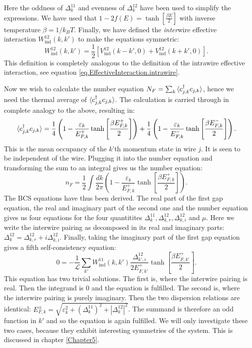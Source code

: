 Here the oddness of $\Delta^{11}_k$ and evenness of $\Delta^{12}_k$ have been used to simplify the expressions. We have used that $1 - 2f(E) = \tanh\left[\frac{\beta E}{2}\right]$ with inverse temperature $\beta = 1 / k_BT$. Finally, we have defined the \textit{inter}wire effective interaction $W_{\text{ind}}^{12}(k, k')$ to make the equations symmetric:
\begin{equation}
W_{\text{ind}}^{12}(k, k') = \frac{1}{2}\left[V_{\text{ind}}^{12}(k - k', 0) + V_{\text{ind}}^{12}(k + k', 0) \right].
\label{eq.EffectiveInteraction.interwire}
\end{equation}
This definition is completely analogous to the definition of the intrawire effective interaction, see equation \eqref{eq.EffectiveInteraction.intrawire}. 

Now we wish to calculate the number equation $N_F = \sum_k \braket{c^\dagger_{j,k}c_{j,k}}$, hence we need the thermal average of $\braket{c^\dagger_{j,k}c_{j,k}}$. The calculation is carried through in complete analogy to the above, resulting in:
\begin{equation}
\braket{c^\dagger_{j,k}c_{j,k}} = \frac{1}{4}\left( 1 - \frac{\varepsilon_k}{E^{+}_{F,k}}\tanh\left[\frac{\beta E^{+}_{F,k}}{2}\right] \right) + \frac{1}{4}\left( 1 - \frac{\varepsilon_k}{E^{-}_{F,k}}\tanh\left[\frac{\beta E^{-}_{F,k}}{2}\right] \right).
\label{eq.meanoccupancy}
\end{equation}
This is the mean occupancy of the $k$'th momentum state in wire $j$. It is seen to be independent of the wire. Plugging it into the number equation and transforming the sum to an integral gives us the number equation:
\begin{equation}
n_F = \frac{1}{2}\int \frac{dk}{2\pi} \left( 1 - \frac{\varepsilon_k}{E^{+}_{F,k}}\tanh\left[\frac{\beta E^{+}_{F,k}}{2}\right] \right). 
\label{eq.2wiresnumberequation}
\end{equation}
The BCS equations have thus been derived. The real part of the first gap equation, the real and imaginary part of the second one and the number equation gives us four equations for the four quantitites $\Delta^{11}_k, \Delta^{12}_{k,r}, \Delta^{12}_{k,i} $ and $\mu$. Here we write the interwire pairing as decomposed in its real and imaginary parts: $\Delta^{12}_k = \Delta^{12}_{k,r} + i\Delta^{12}_{k,i}$. Finally, taking the imaginary part of the first gap equation gives a fifth self-consistency equation:
\begin{equation}
0 = -\frac{1}{\mathcal{L}}\sum_{k'} W_{\text{ind}}^{11}(k, k')\frac{\Delta^{12}_{k',i}}{2E^{+}_{F,k'}}\tanh\left[\frac{\beta E^{+}_{F,k'}}{2}\right].
\end{equation}
This equation has two trivial solutions. The first is, where the interwire pairing is real. Then the integrand is 0 and the equation is fulfilled. The second is, where the interwire pairing is purely imaginary. Then the two dispersion relations are identical: $E^{\pm}_{F,k} = \sqrt{\varepsilon_k^2 + (\Delta^{11}_k)^2 + |\Delta^{12}_k|^2}$. The summand is therefore an odd function in $k'$ and so the equation is again fulfilled. We will only investigate these two cases, because they exhibit interesting symmetries of the system. This is discussed in chapter \ref{Chapter5}. 

